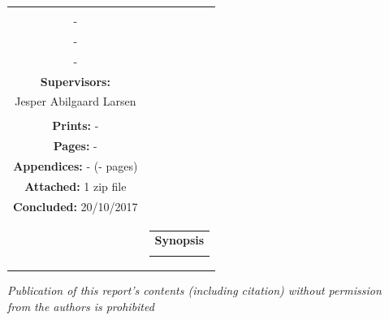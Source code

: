 \begin{nopagebreak}
{\begin{tabular}{cc}
{{\textbf{Participants:}\\
-\\
- \\
- \\

\textbf{Supervisors:}\\
Jesper Abilgaard Larsen \\ %
}\\

\textbf{Prints:} -\\
\textbf{Pages:} -\\
\textbf{Appendices:} - (- pages)\\
\textbf{Attached:} 1 zip file\\
\textbf{Concluded:} 20/10/2017\\

\vfill } &
\parbox{7cm}{
  \vspace{.15cm}
  \hfill
  \begin{tabular}{l}
  {\textbf{Synopsis}}\bigskip \\
  \fbox{
    \parbox{6.5cm}{\bigskip
     {\vfill{\small 
     \bigskip}}
     }}
   \end{tabular}}
\end{tabular}} %

\textit{\phantom{A}Publication of this report's contents (including citation) without permission\\ \phantom{A}from the authors is prohibited}\\

\end{nopagebreak}
%